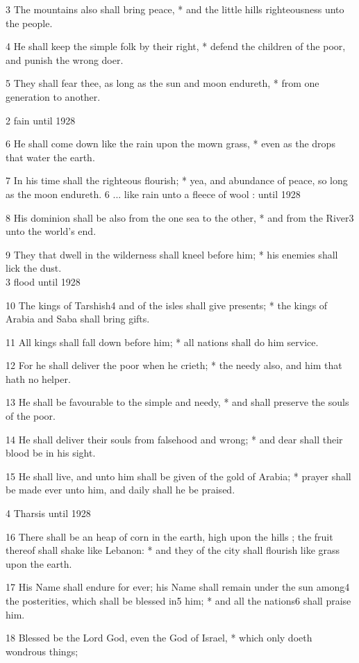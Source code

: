3 The mountains also shall bring peace, * and the little
hills righteousness unto the people.

4 He shall keep the simple folk by their right, * defend
the children of the poor, and punish the wrong doer.

5 They shall fear thee, as long as the sun and moon
endureth, * from one generation to another.

2 fain
until 1928

6 He shall come down like the rain upon the mown grass, * even as the drops
that water the earth.

7 In his time shall the righteous flourish; * yea, and
abundance of peace, so long as the moon endureth. 6 ... like rain unto a fleece
of wool :
until 1928

8 His dominion shall be also from the one sea to the other, * and from the
River3 unto the world's end.

9 They that dwell in the wilderness shall kneel before
him; * his enemies shall lick the dust. \\
3 flood
until 1928

10 The kings of Tarshish4 and of the isles shall give presents;
* the kings of Arabia and Saba shall bring gifts.

11 All kings shall fall down before him; * all nations
shall do him service.

12 For he shall deliver the poor when he crieth; * the
needy also, and him that hath no helper.

13 He shall be favourable to the simple and needy, *
and shall preserve the souls of the poor.

14 He shall deliver their souls from falsehood and wrong;
* and dear shall their blood be in his sight.

15 He shall live, and unto him shall be given of the
gold of Arabia; * prayer shall be made ever unto him, and daily shall he
be praised.

4 Tharsis
until 1928

16 There shall be an heap of corn in the earth, high upon the hills ;
the fruit thereof shall shake like Lebanon: * and they of the city shall
flourish like grass upon the earth.

17 His Name shall endure for ever; his Name shall remain
under the sun among4 the posterities, which shall be blessed
in5 him; * and all the nations6 shall praise him.

18 Blessed be the Lord God, even the God of Israel,
* which only doeth wondrous things;

